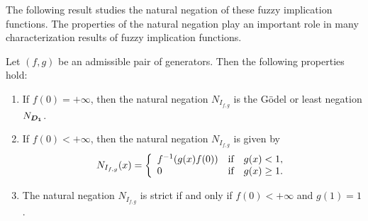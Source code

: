 The following result studies the natural negation of these fuzzy implication functions. The properties of the natural negation play an important role in many characterization results of fuzzy implication functions.
\begin{proposition}\label{negationfg} Let $(f,g)$ be an admissible pair of generators. Then the following properties hold:
	\begin{enumerate}[label=(\roman*)]
		\item If $f(0)=+\infty$, then the natural negation $N_{I_{f,g}}$ is the G\"odel or least negation $N_{\bm{D_1}}$.
		\item If $f(0)<+\infty$, then the natural negation $N_{I_{f,g}}$ is given by
		$$N_{I_{f,g}}(x)= \left\{ \begin{array}{lcc}
			f^{-1}(g(x)f(0)) &   \hbox{if}  & g(x) < 1, \\
			0 &  \hbox{if} & g(x)\geq 1.
		\end{array}
		\right.
		$$
		\item The natural negation $N_{I_{f,g}}$ is strict if and only if $f(0) < +\infty$ and $g(1)=1$.   
	\end{enumerate}
\end{proposition}

